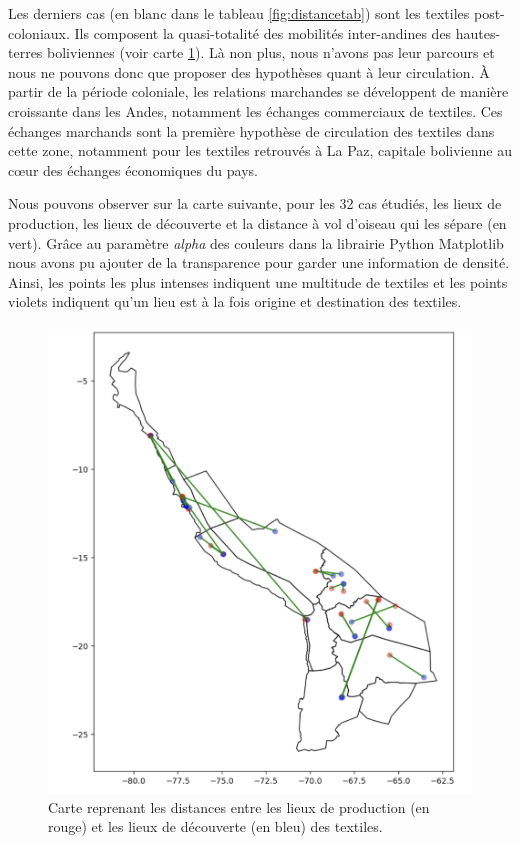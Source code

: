 Les derniers cas (en blanc dans le tableau \ref{fig:distancetab}) sont les textiles post-coloniaux. Ils composent la quasi-totalité des mobilités inter-andines des hautes-terres boliviennes (voir carte \ref{fig:distance_map}). Là non plus, nous n'avons pas leur parcours et nous ne pouvons donc que proposer des hypothèses quant à leur circulation. À partir de la période coloniale, les relations marchandes se développent de manière croissante dans les Andes, notamment les échanges commerciaux de textiles. Ces échanges marchands sont la première hypothèse de circulation des textiles dans cette zone, notamment pour les textiles retrouvés à La Paz, capitale bolivienne au c\oe{}ur des échanges économiques du pays.

Nous pouvons observer sur la carte suivante, pour les 32 cas étudiés, les lieux de production, les lieux de découverte et la distance à vol d'oiseau qui les sépare (en vert). Grâce au paramètre \textit{alpha} des couleurs dans la librairie Python Matplotlib nous avons pu ajouter de la transparence pour garder une information de densité. Ainsi, les points les plus intenses indiquent une multitude de textiles et les points violets indiquent qu'un lieu est à la fois origine et destination des textiles.

\begin{figure}[!h]
	\begin{center}
		\includegraphics[width=15cm]{../images/carteDistance.png}
		\caption{Carte reprenant les distances entre les lieux de production (en rouge) et les lieux de découverte (en bleu) des textiles.}
		\label{fig:distance_map}
	 \end{center}
\end{figure}

